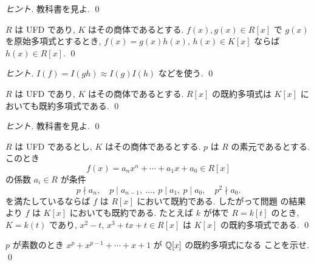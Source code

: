\documentclass[12pt,twoside]{jarticle}
\begin{document}
\begin{proof}[ヒント]
 教科書を見よ. \qed
\end{proof}

\begin{question}
 $R$ は UFD であり, $K$ はその商体であるとする.
 $f(x),g(x)\in R[x]$ で $g(x)$ を原始多項式とするとき, %
 $f(x)=g(x)h(x)$, $h(x)\in K[x]$ ならば $h(x)\in R[x]$.
 \qed
\end{question}

\begin{proof}[ヒント]
 $I(f)=I(gh)\approx I(g)I(h)$ などを使う. \qed
\end{proof}

\begin{question}[UFD係数の既約多項式は商体上でも既約]
\label{q:irred/R=>irred/K}
 $R$ は UFD であり, $K$ はその商体であるとする.
 $R[x]$ の既約多項式は $K[x]$ においても既約多項式である.
 \qed
\end{question}

\begin{proof}[ヒント]
 教科書を見よ. \qed
\end{proof}

\begin{question}
\label{q:Eisenstein/UFD}
 $R$ は UFD であるとし, $K$ はその商体であるとする.
 $p$ は $R$ の素元であるとする. このとき
 \begin{equation*}
  f(x) = a_nx^n + \cdots + a_1x + a_0 \in R[x]
 \end{equation*}
 の係数 $a_i\in R$ が条件
 \begin{equation*}
  p\nmid a_n, \quad
  p\mid a_{n-1},\ \ldots,\ p\mid a_1,\ p\mid a_0, \quad
  p^2\nmid a_0.
 \end{equation*}
 を満たしているならば $f$ は $R[x]$ において既約である.
 したがって問題  の結果より %
 $f$ は $K[x]$ においても既約である.
 たとえば $k$ が体で $R=k[t]$ のとき, $K=k(t)$ であり, 
 $x^2-t$, $x^3+tx+t\in R[x]$ は $K[x]$ の既約多項式である.
 \qed
\end{question}


\begin{question}
 $p$ が素数のとき $x^p+x^{p-1}+\cdots+x+1$ が ${\mathbb Q}[x]$ の既約多項式になる
 ことを示せ. \qed
\end{question}
\end{document}
